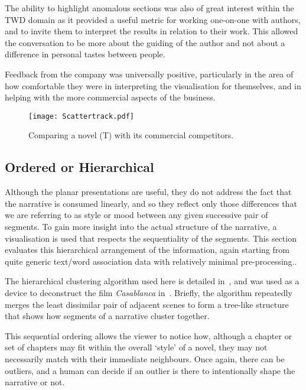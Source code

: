 \documentclass{article}
\begin{document}
The ability to highlight anomalous sections was also of great interest within the TWD domain as it provided a useful metric for working one-on-one with authors, and to invite them to interpret the results in relation to their work. This allowed the conversation to be more about the guiding of the author and not about a difference in personal tastes between people.  

Feedback from the company was universally positive, particularly in the area of how comfortable they were in interpreting the visualisation for themselves, and in helping with the more commercial aspects of the business.

\begin{figure}[h]
\begin{center}
\texttt{[image: Scattertrack.pdf]}
\caption{Comparing a novel (T) with its commercial competitors.}
\label{track}
\end{center}
\end{figure}

\subsection{Ordered or Hierarchical}
Although the planar presentations are useful, they do not address the fact that the narrative is consumed linearly, and so they reflect only those differences that we are referring to as style or mood between any given successive pair of segments.  To gain more insight into the actual structure of the narrative, a visualisation is used that respects the sequentiality of the segments. This section evaluates this hierarchical arrangement of the information, again starting from quite generic text/word association data with relatively minimal pre-processing..  

The hierarchical clustering algorithm used here is detailed in~\cite{murtagh1985multidimensional}, and was used as a device to deconstruct the film {\em Casablanca} in~\cite{Murtagh2009302}. Briefly, the algorithm repeatedly merges the least dissimilar pair of adjacent scenes to form a tree-like structure that shows how segments of a narrative cluster together. 

This sequential ordering allows the viewer to notice how, although a chapter or set of chapters may fit within the overall `style' of a novel, they may not necessarily match with their immediate neighbours. Once again, there can be outliers, and a human can decide if an outlier is there to intentionally shape the narrative or not. 
\end{document}
